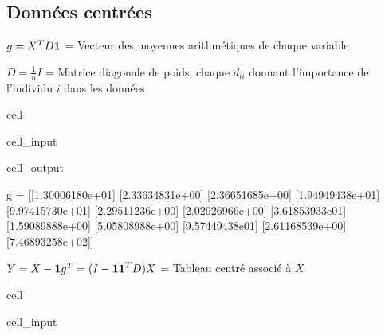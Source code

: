 \documentclass[letterpaper,10pt,french]{sphinxmanual}
\begin{document}
\subsection{Données centrées}
\label{\detokenize{acp:id1}}
\sphinxAtStartPar
\(g=X^TD{\bf 1}\) = Vecteur des moyennes arithmétiques de chaque variable

\sphinxAtStartPar
\(D=\frac{1}{n}I\) = Matrice diagonale de poids, chaque \(d_{ii}\) donnant l’importance de l’individu \(i\) dans les données

\begin{sphinxuseclass}{cell}
\begin{sphinxuseclass}{cell_input}
\begin{sphinxVerbatim}[commandchars=\\\{\}]
  
    
  \PYG{p}{[}  \PYG{p}{[}\PYG{p}{]}\PYG{p}{]}
      
 
\end{sphinxVerbatim}

\end{sphinxuseclass}
\begin{sphinxuseclass}{cell_output}
\begin{sphinxVerbatim}[commandchars=\\\{\}]
g = 
 [[1.30006180e+01]
 [2.33634831e+00]
 [2.36651685e+00]
 [1.94949438e+01]
 [9.97415730e+01]
 [2.29511236e+00]
 [2.02926966e+00]
 [3.61853933e\PYGZhy{}01]
 [1.59089888e+00]
 [5.05808988e+00]
 [9.57449438e\PYGZhy{}01]
 [2.61168539e+00]
 [7.46893258e+02]]
\end{sphinxVerbatim}

\end{sphinxuseclass}
\end{sphinxuseclass}
\sphinxAtStartPar
\(Y = X - {\bf 1} g^T = (I - {\bf 11}^TD)X\) = Tableau centré associé à \(X\)

\begin{sphinxuseclass}{cell}
\begin{sphinxuseclass}{cell_input}
\begin{sphinxVerbatim}[commandchars=\\\{\}]
  
      
\end{sphinxVerbatim}

\end{sphinxuseclass}
\end{sphinxuseclass}
\end{document}
